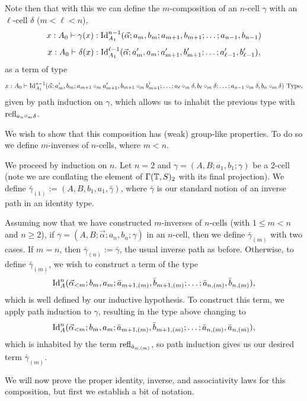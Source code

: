 \documentclass{article}
\begin{document}
Note then that with this we can define the $m$-composition of an $n$-cell $\gamma$ with an $\ell$-cell $\delta$ ($m<\ell<n$),
$$ x:A_0\vdash\gamma(x):\operatorname{Id}_{A_1}^{n-1}(\vec{\alpha};a_m,b_m;a_{m+1},b_{m+1};\dots;a_{n-1},b_{n-1}) $$
$$ x:A_0\vdash\delta(x):\operatorname{Id}_{A_1}^{\ell-1}(\vec{\alpha};a'_m,a_m;a'_{m+1},b'_{m+1};\dots;a'_{\ell-1},b'_{\ell-1}), $$
as a term of type
$$ x:A_0\vdash\operatorname{Id}_{A_1}^{n-1}(\vec{\alpha};a'_m,b_m;a_{m+1}\circ_ma'_{m+1},b_{m+1}\circ_mb'_{m+1};\dots;a_\ell\circ_m\delta,b_\ell\circ_m\delta;\dots;a_{n-1}\circ_m\delta,b_n\circ_m\delta)\text{ Type}, $$
given by path induction on $\gamma$, which allows us to inhabit the previous type with $\operatorname{refl}_{a_n\circ_m\delta}$.

We wish to show that this composition has (weak) group-like properties. To do so we define $m$-inverses of $n$-cells, where $m<n$.

\begin{defn}
    We proceed by induction on $n$. Let $n=2$ and $\gamma=(A,B;a_1,b_1;\gamma)$ be a 2-cell (note we are conflating the element of $\Gamma(\mathbb{T},S)_2$ with its final projection). We define $\bar{\gamma}_{(1)}:=(A,B,b_1,a_1,\bar{\gamma})$, where $\bar{\gamma}$ is our standard notion of an inverse path in an identity type.

    Assuming now that we have constructed $m$-inverses of $n$-cells (with $1\leq m<n$ and $n\geq2$), if $\gamma=(A,B;\vec{\alpha};a_n,b_n;\gamma)$ in an $n$-cell, then we define $\bar{\gamma}_{(m)}$ with two cases. If $m=n$, then $\bar{\gamma}_{(n)}:=\bar{\gamma}$, the usual inverse path as before. Otherwise, to define $\bar{\gamma}_{(m)}$, we wish to construct a term of the type
    $$ \operatorname{Id}_A^n(\vec{\alpha}_{<m};b_{m},a_m;\bar{a}_{m+1,(m)},\bar{b}_{m+1,(m)};\dots;\bar{a}_{n,(m)},\bar{b}_{n,(m)}), $$
    which is well defined by our inductive hypothesis. To construct this term, we apply path induction to $\gamma$, resulting in the type above changing to
    $$ \operatorname{Id}_A^n(\vec{\alpha}_{<m};b_{m},a_m;\bar{a}_{m+1,(m)},\bar{b}_{m+1,(m)};\dots;\bar{a}_{n,(m)},\bar{a}_{n,(m)}), $$
    which is inhabited by the term $\operatorname{refl}_{\bar{a}_{n,(m)}}$, so path induction gives us our desired term $\bar{\gamma}_{(m)}$. %
\end{defn}

We will now prove the proper identity, inverse, and associativity laws for this composition, but first we establish a bit of notation.
\end{document}
